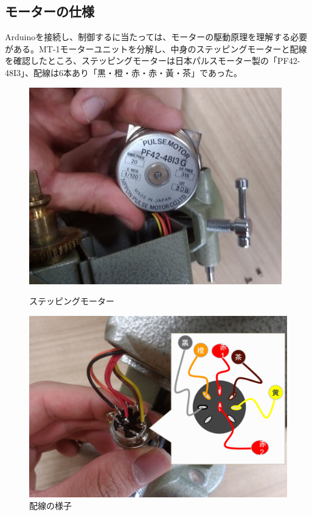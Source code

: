 \documentclass[../../main]{subfiles}
\begin{document}
\subsection{モーターの仕様}
Arduinoを接続し、制御するに当たっては、モーターの駆動原理を理解する必要がある。MT-1モーターユニットを分解し、中身のステッピングモーターと配線を確認したところ、ステッピングモーターは日本パルスモーター製の「PF42-48I3」、配線は6本あり「黒・橙・赤・赤・黃・茶」であった。
\begin{figure}
  \centering
  \begin{minipage}{0.4\columnwidth}
    \centering
    \includegraphics[width=\columnwidth]{motor.jpg}
    \caption{ステッピングモーター}
    \label{fig:motor}
  \end{minipage}
  \begin{minipage}{0.4\columnwidth}
    \centering
    \includegraphics[width=\columnwidth]{pin.png}
    \caption{配線の様子}
    \label{fig:pin}
  \end{minipage}
\end{figure}
\end{document}
